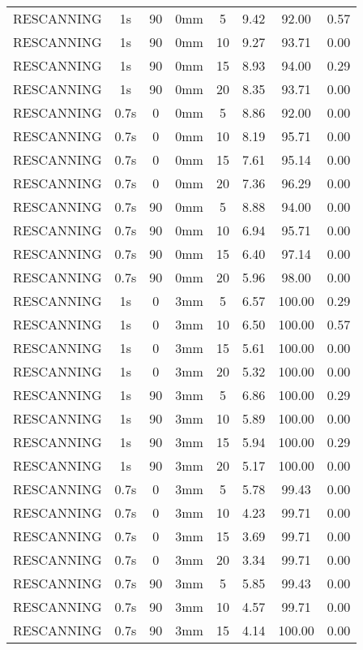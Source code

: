 \begin{table}[H]
\begin{tabular}{|c||c|c|c|c||c|c|c|}
RESCANNING & 1s & 90 & 0mm & 5 & 9.42 & 92.00 & 0.57 \\
RESCANNING & 1s & 90 & 0mm & 10 & 9.27 & 93.71 & 0.00 \\
RESCANNING & 1s & 90 & 0mm & 15 & 8.93 & 94.00 & 0.29 \\
RESCANNING & 1s & 90 & 0mm & 20 & 8.35 & 93.71 & 0.00 \\
RESCANNING & 0.7s & 0 & 0mm & 5 & 8.86 & 92.00 & 0.00 \\
RESCANNING & 0.7s & 0 & 0mm & 10 & 8.19 & 95.71 & 0.00 \\
RESCANNING & 0.7s & 0 & 0mm & 15 & 7.61 & 95.14 & 0.00 \\
RESCANNING & 0.7s & 0 & 0mm & 20 & 7.36 & 96.29 & 0.00 \\
RESCANNING & 0.7s & 90 & 0mm & 5 & 8.88 & 94.00 & 0.00 \\
RESCANNING & 0.7s & 90 & 0mm & 10 & 6.94 & 95.71 & 0.00 \\
RESCANNING & 0.7s & 90 & 0mm & 15 & 6.40 & 97.14 & 0.00 \\
RESCANNING & 0.7s & 90 & 0mm & 20 & 5.96 & 98.00 & 0.00 \\
RESCANNING & 1s & 0 & 3mm & 5 & 6.57 & 100.00 & 0.29 \\
RESCANNING & 1s & 0 & 3mm & 10 & 6.50 & 100.00 & 0.57 \\
RESCANNING & 1s & 0 & 3mm & 15 & 5.61 & 100.00 & 0.00 \\
RESCANNING & 1s & 0 & 3mm & 20 & 5.32 & 100.00 & 0.00 \\
RESCANNING & 1s & 90 & 3mm & 5 & 6.86 & 100.00 & 0.29 \\
RESCANNING & 1s & 90 & 3mm & 10 & 5.89 & 100.00 & 0.00 \\
RESCANNING & 1s & 90 & 3mm & 15 & 5.94 & 100.00 & 0.29 \\
RESCANNING & 1s & 90 & 3mm & 20 & 5.17 & 100.00 & 0.00 \\
RESCANNING & 0.7s & 0 & 3mm & 5 & 5.78 & 99.43 & 0.00 \\
RESCANNING & 0.7s & 0 & 3mm & 10 & 4.23 & 99.71 & 0.00 \\
RESCANNING & 0.7s & 0 & 3mm & 15 & 3.69 & 99.71 & 0.00 \\
RESCANNING & 0.7s & 0 & 3mm & 20 & 3.34 & 99.71 & 0.00 \\
RESCANNING & 0.7s & 90 & 3mm & 5 & 5.85 & 99.43 & 0.00 \\
RESCANNING & 0.7s & 90 & 3mm & 10 & 4.57 & 99.71 & 0.00 \\
RESCANNING & 0.7s & 90 & 3mm & 15 & 4.14 & 100.00 & 0.00 \\

\end{tabular}
\end{table}
